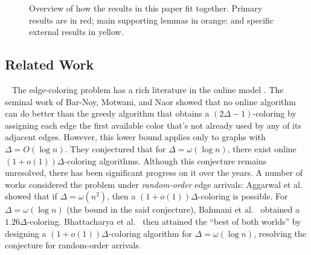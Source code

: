 \documentclass[10pt]{article}
\theoremstyle{definition}\newtheorem{definition}[lemma]{Definition}
\theoremstyle{remark}  \newtheorem*{remark}{Remark}
\newcommand{\mypar}[1]{\medskip\noindent{\bfseries #1.}~}
\begin{document}
\begin{figure}[!htb]
    \caption{Overview of how the results in this paper fit together. Primary results are in red; main supporting lemmas in orange; and specific external results in yellow. \label{fig:overview}}
\end{figure}






\subsection{Related Work}\label{sec:related}

\mypar{Online model} The edge-coloring problem has a rich literature in the online model \cite{aggarwal2003switch, AnsariSZ22, BarNoyMN92, BahmaniMM12, BhattacharyaGW21, CohenPW19, FavrholdtM18, FavrholdtN03, Mikkelsen15, Mikkelsen16, NaorSW23, KulkarniLSST22, SaberiW21}. The seminal work of Bar-Noy, Motwani, and Naor \cite{BarNoyMN92} showed that no online algorithm can do better than the greedy algorithm that obtains a $(2\Delta-1)$-coloring by assigning each edge the first available color that's not already used by any of its adjacent edges. However, this lower bound applies only to graphs with $\Delta=O(\log n)$. They conjectured that for $\Delta=\omega(\log n)$, there exist online $(1+o(1))\Delta$-coloring algorithms. Although this conjecture remains unresolved, there has been significant progress on it over the years. A number of works \cite{aggarwal2003switch, BahmaniMM12, BhattacharyaGW21} considered the problem under \emph{random-order} edge arrivals: Aggarwal et al.~\cite{aggarwal2003switch} showed that if $\Delta=\omega(n^2)$, then a $(1+o(1))\Delta$-coloring is possible. For $\Delta=\omega(\log n)$ (the bound in the said conjecture), Bahmani et al.~\cite{BahmaniMM12} obtained a $1.26\Delta$-coloring. Bhattacharya et al.~\cite{BhattacharyaGW21} then attained the ``best of both worlds'' by designing a $(1+o(1))\Delta$-coloring algorithm for $\Delta=\omega(\log n)$, resolving the conjecture for random-order arrivals. 
\end{document}
